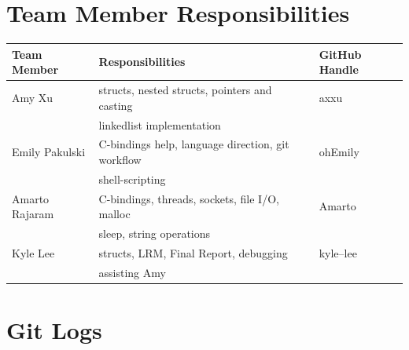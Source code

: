 \section{Team Member Responsibilities}
  

  \begin{tabular}{ | l | l | l |}\hline
    Team Member  & Responsibilities      & GitHub Handle\\ \hline
    Amy Xu & structs, nested structs, pointers and casting & axxu\\
    & linkedlist implementation & \\
    Emily Pakulski & C-bindings help, language direction, git workflow & ohEmily\\
    & shell-scripting & \\
    Amarto Rajaram & C-bindings, threads, sockets, file I/O, malloc & Amarto\\
		& sleep, string operations & \\
    Kyle Lee & structs, LRM, Final Report, debugging & kyle--lee\\ 
		& assisting Amy & \\ \hline
		
  \end{tabular}
\newpage
\section{Git Logs}



